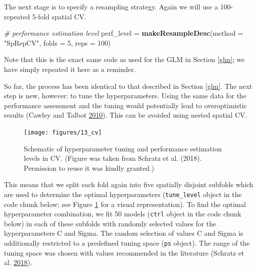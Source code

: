 \documentclass[]{krantz}
\newenvironment{Shaded}{\begin{snugshade}}{\end{snugshade}}
\newcommand{\CommentTok}[1]{\textcolor[rgb]{0.37,0.37,0.37}{\textit{#1}}}
\newcommand{\DataTypeTok}[1]{\textcolor[rgb]{0.27,0.27,0.27}{#1}}
\newcommand{\DecValTok}[1]{\textcolor[rgb]{0.06,0.06,0.06}{#1}}
\newcommand{\KeywordTok}[1]{\textcolor[rgb]{0.27,0.27,0.27}{\textbf{#1}}}
\newcommand{\NormalTok}[1]{#1}
\newcommand{\StringTok}[1]{\textcolor[rgb]{0.5,0.5,0.5}{#1}}
\begin{document}
The next stage is to specify a resampling strategy.
Again we will use a 100-repeated 5-fold spatial CV.

\begin{Shaded}
\begin{Highlighting}[]
\CommentTok{# performance estimation level}
\NormalTok{perf_level =}\StringTok{ }\KeywordTok{makeResampleDesc}\NormalTok{(}\DataTypeTok{method =} \StringTok{"SpRepCV"}\NormalTok{, }\DataTypeTok{folds =} \DecValTok{5}\NormalTok{, }\DataTypeTok{reps =} \DecValTok{100}\NormalTok{)}
\end{Highlighting}
\end{Shaded}

Note that this is the exact same code as used for the GLM in Section \ref{glm}; we have simply repeated it here as a reminder.

So far, the process has been identical to that described in Section \ref{glm}.
The next step is new, however: to tune the hyperparameters.
Using the same data for the performance assessment and the tuning would potentially lead to overoptimistic results (Cawley and Talbot \protect\hyperlink{ref-cawley_overfitting_2010}{2010}).
This can be avoided using nested spatial CV.

\begin{figure}[t]

{\centering \texttt{[image: figures/13\_cv]} 

}

\caption[Schematic of hyperparameter tuning.]{Schematic of hyperparameter tuning and performance estimation levels in CV. (Figure was taken from Schratz et al. (2018). Permission to reuse it  was kindly granted.)}\label{fig:inner-outer}
\end{figure}

This means that we split each fold again into five spatially disjoint subfolds which are used to determine the optimal hyperparameters (\texttt{tune\_level} object in the code chunk below; see Figure \ref{fig:inner-outer} for a visual representation).
To find the optimal hyperparameter combination, we fit 50 models (\texttt{ctrl} object in the code chunk below) in each of these subfolds with randomly selected values for the hyperparameters C and Sigma.
The random selection of values C and Sigma is additionally restricted to a predefined tuning space (\texttt{ps} object).
The range of the tuning space was chosen with values recommended in the literature (Schratz et al. \protect\hyperlink{ref-schratz_performance_nodate}{2018}).
\end{document}
